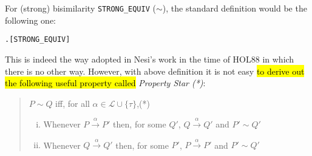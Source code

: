 For (strong) bisimilarity \texttt{STRONG_EQUIV} ($\sim$), the standard definition
would be the following one:
\begin{alltt}
   \HOLSymConst{\HOLTokenStrongEQ}  \HOLSymConst{\HOLTokenEquiv{}} \HOLSymConst{\HOLTokenExists{}}.    \HOLSymConst{\HOLTokenConj{}}  \hfill{[STRONG_EQUIV]}
\end{alltt}
This is indeed the way adopted in Nesi's work \cite{Nesi:1992ve} in the time of HOL88 in which
there is no other way. However, with above definition it is not easy \citep[p.~91]{Mil89}
\hl{to derive out the following useful property called} \emph{Property Star (*)}:
\begin{quote}
  $P\sim Q$ iff, for all $\alpha\in \mathscr{L} \cup \{\tau\}$,\hfill{(*)}
  \begin{enumerate}[(i)]
    \item Whenever $P\overset{\alpha}{\rightarrow}P'$ then, for some
      $Q'$, $Q\overset{\alpha}{\rightarrow}Q'$ and $P'\sim Q'$
    \item Whenever $Q\overset{\alpha}{\rightarrow}Q'$ then, for some
      $P'$, $P\overset{\alpha}{\rightarrow}P'$ and $P'\sim Q'$
  \end{enumerate}
\end{quote}

